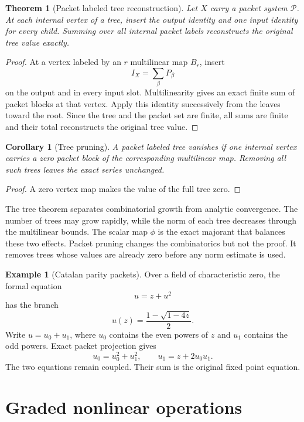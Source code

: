 \documentclass{aomart}
\newtheorem{theorem}{Theorem}[section]
\newtheorem{corollary}[corollary]{Corollary}
\theoremstyle{definition}
\newtheorem{example}[example]{Example}
\theoremstyle{remark}
\newcommand{\Pcal}{\mathcal P}
\begin{document}
\begin{theorem}[Packet labeled tree reconstruction]\label{thm:packet_tree_reconstruction}
Let $X$ carry a packet system $\Pcal$.  At each internal vertex of a tree, insert the output identity and one input identity for every child.  Summing over all internal packet labels reconstructs the original tree value exactly.
\end{theorem}

\begin{proof}
At a vertex labeled by an $r$ multilinear map $B_r$, insert
\[
I_X=\sum_\beta P_\beta
\]
on the output and in every input slot.  Multilinearity gives an exact finite sum of packet blocks at that vertex.  Apply this identity successively from the leaves toward the root.  Since the tree and the packet set are finite, all sums are finite and their total reconstructs the original tree value.
\end{proof}

\begin{corollary}[Tree pruning]\label{cor:tree_pruning}
A packet labeled tree vanishes if one internal vertex carries a zero packet block of the corresponding multilinear map.  Removing all such trees leaves the exact series unchanged.
\end{corollary}

\begin{proof}
A zero vertex map makes the value of the full tree zero.
\end{proof}


The tree theorem separates combinatorial growth from analytic convergence.  The number of trees may grow rapidly, while the norm of each tree decreases through the multilinear bounds.  The scalar map $\phi$ is the exact majorant that balances these two effects.  Packet pruning changes the combinatorics but not the proof.  It removes trees whose values are already zero before any norm estimate is used.

\begin{example}[Catalan parity packets]\label{ex:catalan_parity}
Over a field of characteristic zero, the formal equation
\[
u=z+u^2
\]
has the branch
\[
u(z)=\frac{1-\sqrt{1-4z}}2.
\]
Write $u=u_0+u_1$, where $u_0$ contains the even powers of $z$ and $u_1$ contains the odd powers.  Exact packet projection gives
\[
u_0=u_0^2+u_1^2,
\qquad
u_1=z+2u_0u_1.
\]
The two equations remain coupled.  Their sum is the original fixed point equation.
\end{example}

\section{Graded nonlinear operations}\label{sec:graded_operations}
\end{document}
